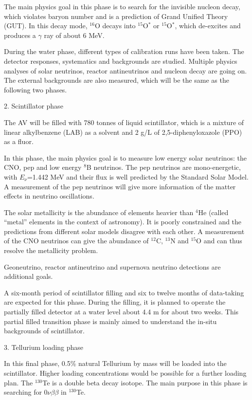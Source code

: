 The main physics goal in this phase is to search for the invisible nucleon decay, which violates baryon number and is a prediction of Grand Unified Theory (GUT). In this decay mode, $^{16}$O decays into $^{15}$O$^*$ or $ ^{15}$O$^*$, which de-excites and produces a $\gamma$ ray of about 6 MeV.

During the water phase, different types of calibration runs have been taken. The detector responses, systematics and backgrounds are studied. Multiple physics analyses of solar neutrinos, reactor antineutrinos and nucleon decay are going on. The external backgrounds are also measured, which will be the same as the following two phases. 

2. Scintillator phase

The AV will be filled with 780 tonnes of liquid scintillator, which is a mixture of linear alkylbenzene (LAB) as a solvent and 2 g/L of 2,5-diphenyloxazole (PPO) as a fluor.

In this phase, the main physics goal is to measure low energy solar neutrinos: the CNO, pep and low energy $^8$B neutrinos. The pep neutrinos are mono-energetic, with $E_\nu$=1.442 MeV and their flux is well predicted by the Standard Solar Model. A measurement of the pep neutrinos will give more information of the matter effects in neutrino oscillations\cite{borexino}. 

The solar metallicity is the abundance of elements heavier than $^4$He (called ``metal'' elements in the context of astronomy). It is poorly constrained and the predictions from different solar models disagree with each other. A measurement of the CNO neutrinos can give the abundance of $^{12}$C, $^{13}$N and $^{15}$O and can thus resolve the metallicity problem\cite{cno}.

Geoneutrino, reactor antineutrino and supernova neutrino detections are additional goals.

A six-month period of scintillator filling and six to twelve months of data-taking are expected for this phase. During the filling, it is planned to operate the partially filled detector at a water level about 4.4 m for about two weeks. This partial filled transition phase is mainly aimed to understand the in-situ backgrounds of scintillator. 

3. Tellurium loading phase

In this final phase, 0.5\% natural Tellurium by mass will be loaded into the scintillator.
Higher loading concentrations would be possible for a further loading plan\cite{Paton:2019kgy}.
 The $^{130}$Te is a double beta decay isotope. The main purpose in this phase is searching for $0\nu\beta\beta$ in $^{130}$Te.


